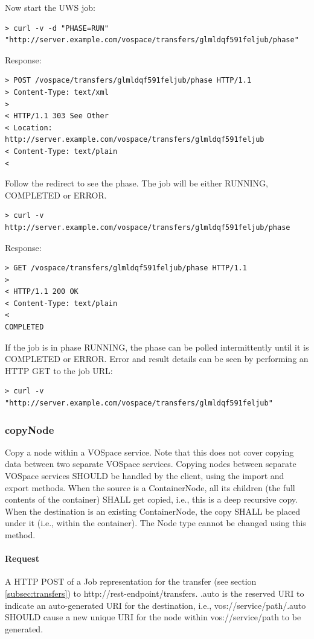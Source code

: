 \documentclass[11pt,a4paper]{ivoa}
\begin{document}
Now start the UWS job:
\begin{lstlisting}
> curl -v -d "PHASE=RUN" "http://server.example.com/vospace/transfers/glmldqf591feljub/phase"
\end{lstlisting}
Response:
\begin{lstlisting}
> POST /vospace/transfers/glmldqf591feljub/phase HTTP/1.1
> Content-Type: text/xml
>
< HTTP/1.1 303 See Other
< Location: http://server.example.com/vospace/transfers/glmldqf591feljub
< Content-Type: text/plain
<
\end{lstlisting}
Follow the redirect to see the phase.  The job will be either RUNNING, COMPLETED or ERROR.
\begin{lstlisting}
> curl -v http://server.example.com/vospace/transfers/glmldqf591feljub/phase
\end{lstlisting}
Response:
\begin{lstlisting}
> GET /vospace/transfers/glmldqf591feljub/phase HTTP/1.1
>
< HTTP/1.1 200 OK
< Content-Type: text/plain
<
COMPLETED
\end{lstlisting}
If the job is in phase RUNNING, the phase can be polled intermittently until it is COMPLETED or ERROR.
Error and result details can be seen by performing an HTTP GET to the job URL:
\begin{lstlisting}
> curl -v "http://server.example.com/vospace/transfers/glmldqf591feljub"
\end{lstlisting}

\subsubsection{copyNode}
\label{subsubsec:copynode}
Copy a node within a VOSpace service.
Note that this does not cover copying data between two separate VOSpace services.
Copying nodes between separate VOSpace services SHOULD be handled by the client, using the import and export methods.
When the source is a ContainerNode, all its children (the full contents of the container) SHALL get copied, i.e., this is a deep recursive copy.
When the destination is an existing ContainerNode, the copy SHALL be placed under it (i.e., within the container).
The Node type cannot be changed using this method.

\paragraph{Request}
A HTTP POST of a Job representation for the transfer (see section \ref{subsec:transfers}) to http://rest-endpoint/transfers.
.auto is the reserved URI to indicate an auto-generated URI for the destination, i.e., vos://service/path/.auto SHOULD cause a new unique URI for the node within vos://service/path to be generated.
\end{document}
